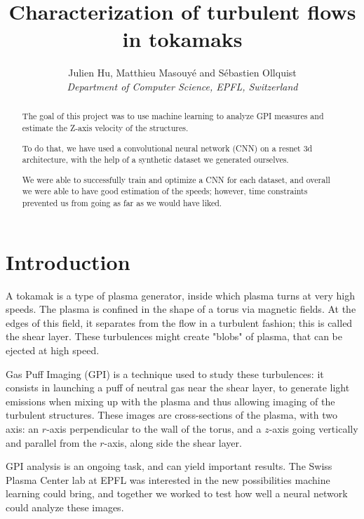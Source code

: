 \documentclass[10pt,conference]{IEEEtran}
\begin{document}
\title{Characterization of turbulent flows in tokamaks}

\author{
  Julien Hu, Matthieu Masouyé and Sébastien Ollquist\\
  \textit{Department of Computer Science, EPFL, Switzerland}
}

\maketitle
\thispagestyle{plain}
\pagestyle{plain}

\begin{abstract}
    The goal of this project was to use machine learning to analyze GPI measures and estimate the Z-axis velocity of the structures.\par 
    To do that, we have used a convolutional neural network (CNN) on a resnet 3d architecture, with the help of a synthetic dataset we generated ourselves.\par
    We were able to successfully train and optimize a CNN for each dataset, and overall we were able to have good estimation of the speeds; however, time constraints prevented us from going as far as we would have liked.
\end{abstract}

\section{Introduction}
A tokamak is a type of plasma generator, inside which plasma turns at very high speeds. The plasma is confined in the shape of a torus via magnetic fields. At the edges of this field, it separates from the flow in a turbulent fashion; this is called the shear layer. These turbulences might create "blobs" of plasma, that can be ejected at high speed.\par 
Gas Puff Imaging (GPI) is a technique used to study these turbulences: it consists in launching a puff of neutral gas near the shear layer, to generate light emissions when mixing up with the plasma and thus allowing imaging of the turbulent structures. These images are cross-sections of the plasma, with two axis: an $r$-axis perpendicular to the wall of the torus, and a $z$-axis going vertically and parallel from the $r$-axis, along side the shear layer.\par
GPI analysis is an ongoing task, and can yield important results. The Swiss Plasma Center lab at EPFL was interested in the new possibilities machine learning could bring, and together we worked to test how well a neural network could analyze these images.\par
 
\end{document}
